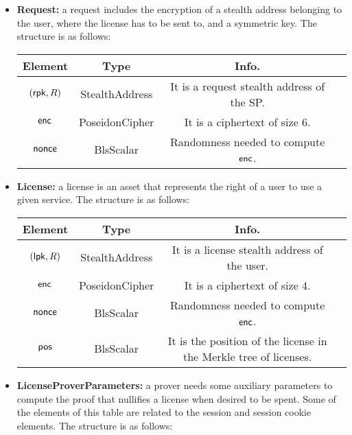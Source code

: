 \begin{itemize}
    \item \textbf{Request:} a request includes the encryption of a stealth address belonging to the user, where the license has to be sent to, and a symmetric key. The structure is as follows:

    \begin{center}
        \begin{tabular}{ |c|c|c|c| } 
        \hline
        \textbf{Element} & \textbf{Type} & \textbf{Info.} \\
        \hline
        $(\mathsf{rpk}, R)$ & StealthAddress & It is a request stealth address of the SP. \\
        $\mathsf{enc}$ & PoseidonCipher & It is a ciphertext of size 6. \\
        $\mathsf{nonce}$ & BlsScalar & Randomness needed to compute $\mathsf{enc}$. \\ 
        \hline
        \end{tabular}
    \end{center}


    \item \textbf{License:} a license is an asset that represents the right of a user to use a given service. The structure is as follows:

    \begin{center}
        \begin{tabular}{ |c|c|c|c| } 
        \hline
        \textbf{Element} & \textbf{Type} & \textbf{Info.} \\
        \hline
        $(\mathsf{lpk}, R)$ & StealthAddress & It is a license stealth address of the user. \\
        $\mathsf{enc}$ & PoseidonCipher & It is a ciphertext of size 4. \\
        $\mathsf{nonce}$ & BlsScalar & Randomness needed to compute $\mathsf{enc}$. \\ 
        $\mathsf{pos}$ & BlsScalar & It is the position of the license in the Merkle tree of licenses. \\ 
        \hline
        \end{tabular}
    \end{center}

    \item \textbf{LicenseProverParameters:} a prover needs some auxiliary parameters to compute the proof that nullifies a license when desired to be spent. Some of the elements of this table are related to the session and session cookie elements. The structure is as follows:


\end{itemize}
